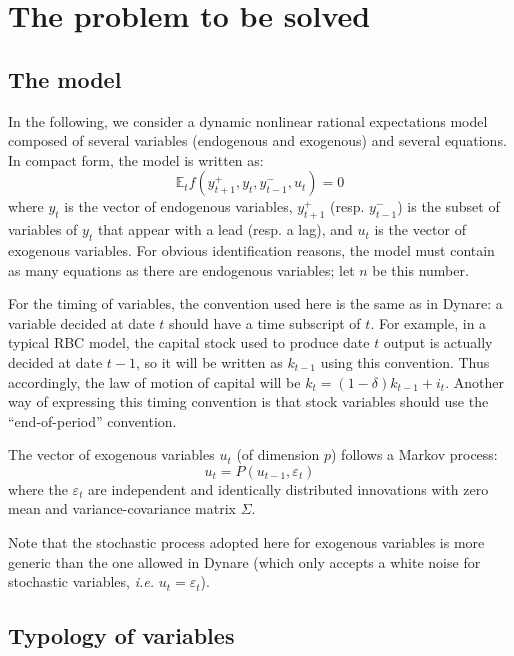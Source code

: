 \documentclass[11pt,a4paper]{article}
\begin{document}
\section{The problem to be solved}
\label{sec:model}

\subsection{The model}

In the following, we consider a dynamic nonlinear rational expectations model
composed of several variables (endogenous and exogenous) and several
equations. In compact form, the model is written as:
\begin{equation}
  \label{eq:model}
  \mathbb{E}_t f(y^+_{t+1}, y_t, y^-_{t-1}, u_t) = 0
\end{equation}
where $y_t$ is the vector of endogenous variables, $y^+_{t+1}$
(resp. $y^-_{t-1}$) is the subset of variables of $y_t$ that appear with a lead
(resp. a lag), and $u_t$ is the vector of exogenous variables. For obvious
identification reasons, the model must contain as many equations as there are
endogenous variables; let $n$ be this number.

For the timing of variables, the convention used here is the same as in Dynare:
a variable decided at date $t$ should have a time subscript of $t$. For
example, in a typical RBC model, the capital stock used to produce date $t$
output is actually decided at date $t-1$, so it will be written as $k_{t-1}$
using this convention. Thus accordingly, the law of motion of capital will be
$k_t = (1-\delta)k_{t-1} + i_t$. Another way of expressing this timing
convention is that stock variables should use the ``end-of-period'' convention.

The vector of exogenous variables $u_t$ (of dimension $p$) follows a Markov
process:
\begin{equation*}
  u_t = P(u_{t-1}, \varepsilon_t)
\end{equation*}
where the $\varepsilon_t$ are independent and identically distributed
innovations with zero mean and variance-covariance matrix $\Sigma$.

Note that the stochastic process adopted here for exogenous variables is more
generic than the one allowed in Dynare (which only accepts a white noise for
stochastic variables, \textit{i.e.} $u_t = \varepsilon_t$).

\subsection{Typology of variables}
\end{document}
